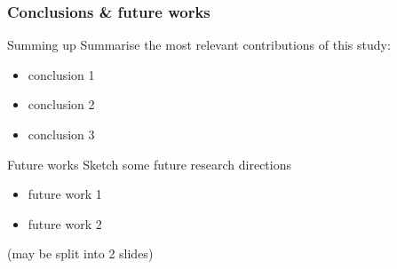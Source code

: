 \documentclass[handout]{beamer}\mode<handout>{\usetheme{AMSBolognaFC}}
\begin{document}
\begin{frame}%
\frametitle{Conclusions \& future works}

\begin{block}{Summing up}
    Summarise the most relevant contributions of this study:
    \begin{itemize}
        \item conclusion 1
        \item conclusion 2
        \item conclusion 3
    \end{itemize}
\end{block}

\begin{exampleblock}{Future works}
    Sketch some future research directions
    \begin{itemize}
        \item future work 1
        \item future work 2
    \end{itemize}
\end{exampleblock}

(may be split into 2 slides)

\end{frame}

\section*{}
\frame{\titlepage}

\end{document}
